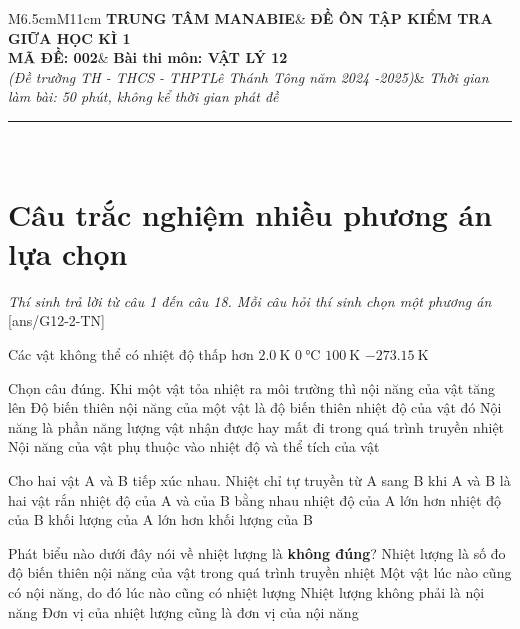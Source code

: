 \begin{tabular}{M{6.5cm}M{11cm}}
	\textbf{TRUNG TÂM MANABIE}& \textbf{ĐỀ ÔN TẬP KIỂM TRA GIỮA HỌC KÌ 1}\\
	\textbf{MÃ ĐỀ: 002}& \textbf{Bài thi môn: VẬT LÝ 12}\\
	\textit{(Đề trường TH - THCS - THPT\newline Lê Thánh Tông năm 2024 -2025)}& \textit{Thời gian làm bài: 50 phút, không kể thời gian phát đề}
	
	\noindent\rule{4cm}{0.8pt} \\
\end{tabular}
\setcounter{section}{0}
\section{Câu trắc nghiệm nhiều phương án lựa chọn}
\textit{Thí sinh trả lời từ câu 1 đến câu 18. Mỗi câu hỏi thí sinh chọn một phương án}
\setcounter{ex}{0}
[ans/G12-2-TN]
\begin{ex}
	Các vật không thể có nhiệt độ thấp hơn
	\choice
	{$\SI{2.0}{\kelvin}$}
	{$\SI{0}{\celsius}$}
	{$\SI{100}{\kelvin}$}
	{\True $\SI{-273.15}{\kelvin}$}
	\loigiai{}
\end{ex}
\begin{ex}
	Chọn câu đúng.	
	\choice
	{Khi một vật tỏa nhiệt ra môi trường thì nội năng của vật tăng lên}
	{Độ biến thiên nội năng của một vật là độ biến thiên nhiệt độ của vật đó}
	{\True Nội năng là phần năng lượng vật nhận được hay mất đi trong quá trình truyền nhiệt}
	{Nội năng của vật phụ thuộc vào nhiệt độ và thể tích của vật}
	\loigiai{}
\end{ex}
\begin{ex}
	Cho hai vật A và B tiếp xúc nhau. Nhiệt chỉ tự truyền từ A sang B khi
	\choice
	{A và B là hai vật rắn}
	{nhiệt độ của A và của B bằng nhau}
	{\True nhiệt độ của A lớn hơn nhiệt độ của B}
	{khối lượng của A lớn hơn khối lượng của B}
	\loigiai{}
\end{ex}
\begin{ex}
	Phát biểu nào dưới đây nói về nhiệt lượng là \textbf{không đúng}?	
	\choice
	{Nhiệt lượng là số đo độ biến thiên nội năng của vật trong quá trình truyền nhiệt}
	{\True Một vật lúc nào cũng có nội năng, do đó lúc nào cũng có nhiệt lượng}
	{Nhiệt lượng không phải là nội năng}
	{Đơn vị của nhiệt lượng cũng là đơn vị của nội năng}
	\loigiai{}
\end{ex}
